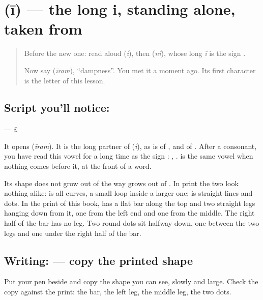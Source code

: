 \section[\texorpdfstring{\ta{ஈ} (ī)}{ஈ (ī)}]{ (ī) — the long i, standing alone, taken from }

\label{lesson:TA-S141-letter-ii}



\begin{quote}
Before the new one: read \textbf{} aloud (\emph{i}), then \textbf{} (\emph{nī}), whose long \emph{ī} is the sign .

Now say \textbf{} (\emph{īram}), \textquotedblleft{}dampness\textquotedblright{}. You met it a moment ago. Its first character is the letter of this lesson.
\end{quote}

\subsection*{Script you'll notice: }
\textbf{} — \emph{ī}.

It opens \textbf{} (\emph{īram}). It is the long partner of \textbf{} (\emph{i}), as \textbf{} is of \textbf{}, and \textbf{} of \textbf{}. After a consonant, you have read this vowel for a long time as the sign : \textbf{}, \textbf{}. \textbf{} is the same vowel when nothing comes before it, at the front of a word.

Its shape does not grow out of \textbf{} the way \textbf{} grows out of \textbf{}. In print the two look nothing alike: \textbf{} is all curves, a small loop inside a larger one; \textbf{} is straight lines and dots. In the print of this book, \textbf{} has a flat bar along the top and two straight legs hanging down from it, one from the left end and one from the middle. The right half of the bar has no leg. Two round dots sit halfway down, one between the two legs and one under the right half of the bar.

\subsection*{Writing:  — copy the printed shape}
Put your pen beside \textbf{} and copy the shape you can see, slowly and large. Check the copy against the print: the bar, the left leg, the middle leg, the two dots.

